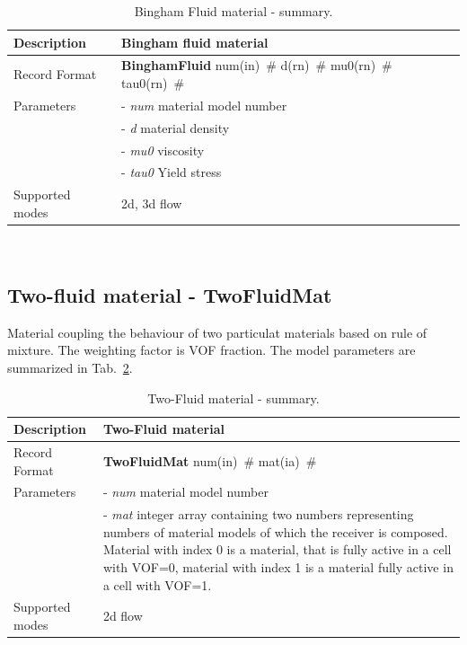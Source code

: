 \documentclass[a4paper]{article}
\newcommand{\descitem}[1]{{\noindent \bf #1}}
\newcommand{\elemparam}[2]{{{#1\tiny (#2)}~\#}}
\newcommand{\param}[1]{{\it #1}}
\newenvironment{mmt}{\begin{tabular}{|l|p{9cm}|}}{\end{tabular}\\}
\newenvironment{mmt}{\begin{tabular}{|l|l|}}{\end{tabular}\\}
\begin{document}
\begin{table}[!htb]
\begin{mmt}
\hline
Description & Bingham fluid material\\
\hline
Record Format & \descitem{BinghamFluid} \elemparam{num}{in}
\elemparam{d}{rn} \elemparam{mu0}{rn} \elemparam{tau0}{rn}\\
Parameters &- \param{num} material model number\\
&- \param{d} material density\\
&- \param{mu0} viscosity\\
&- \param{tau0} Yield stress\\
Supported modes& 2d, 3d flow\\
\hline
\end{mmt}
\caption{Bingham Fluid material - summary.}
\label{BinghamFluidMaterial_table}
\end{table}



\subsection{Two-fluid material - TwoFluidMat}
\label{TwoFluidMaterial}
Material coupling the behaviour of two particulat materials based on
rule of mixture. The weighting factor is VOF fraction.
The model parameters are summarized in Tab.~\ref{TwoFluidMaterial_table}.

\begin{table}[!htb]
\begin{mmt}
\hline
Description & Two-Fluid material\\
\hline
Record Format & \descitem{TwoFluidMat} \elemparam{num}{in}
\elemparam{mat}{ia}\\
Parameters &- \param{num} material model number\\
&- \param{mat} integer array containing two numbers representing
numbers of material models of which the receiver is composed. Material
with index 0 is a material, that is fully active in a cell with VOF=0,
material with index 1 is a material fully active in a cell with VOF=1.\\
Supported modes& 2d flow\\
\hline
\end{mmt}
\caption{Two-Fluid material - summary.}
\label{TwoFluidMaterial_table}
\end{table}
\end{document}
